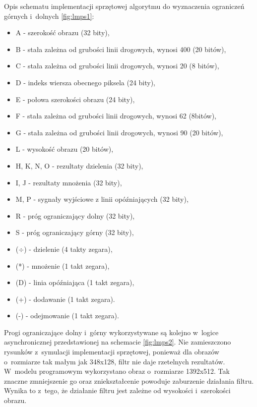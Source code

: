 Opis schematu implementacji sprzętowej algorytmu do wyznaczenia ograniczeń górnych i~dolnych \ref{fig:lmps1}:
\begin{itemize}
	\item A - szerokość obrazu (32 bity),
	\item B - stała zależna od grubości linii drogowych, wynosi 400 (20 bitów),
	\item C - stała zależna od grubości linii drogowych, wynosi 20 (8 bitów),
	\item D - indeks wiersza obecnego piksela (24 bity),
	\item E - połowa szerokości obrazu (24 bity),
	\item F - stała zależna od grubości linii drogowych, wynosi 62 (8bitów),
	\item G - stała zależna od grubości linii drogowych, wynosi 90 (20 bitów),
	\item L - wysokość obrazu (20 bitów),
	\item H, K, N, O - rezultaty dzielenia (32 bity),
	\item I, J - rezultaty mnożenia (32 bity),
	\item M, P - sygnały wyjściowe z linii opóźniających (32 bity),
	\item R - próg ograniczający dolny (32 bity),
	\item S - próg ograniczający górny (32 bity),
	\item ($\div$) - dzielenie (4 takty zegara),
	\item (*) - mnożenie (1 takt zegara),
	\item (D) - linia opóźniająca (1 takt zegara),
	\item (+) - dodawanie (1 takt zegara).
	\item (-) - odejmowanie (1 takt zegara).
\end{itemize}
Progi ograniczające dolny i~górny wykorzystywane są kolejno w~logice asynchronicznej przedstawionej na schemacie \ref{fig:lmps2}. 
Nie zamieszczono rysunków z~symulacji implementacji sprzętowej, ponieważ dla obrazów o~rozmiarze tak małym jak 348x128, filtr nie daje rzetelnych rezultatów. 
W~modelu programowym wykorzystano obraz o~rozmiarze 1392x512. 
Tak znaczne zmniejszenie go oraz zniekształcenie powoduje zaburzenie działania filtru. 
Wynika to z~tego, że działanie filtru jest zależne od wysokości i~szerokości obrazu.


